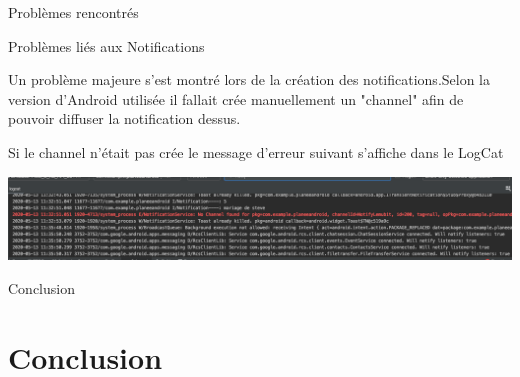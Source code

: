 \documentclass[11pt]{beamer}
\begin{document}
\begin{frame}{Problèmes rencontrés}

\begin{mybox}{Problèmes liés aux Notifications}
\begin{flushleft}
Un problème majeure s'est montré lors de la création 
des notifications.Selon la version d'Android utilisée il fallait crée manuellement un "channel" afin de pouvoir diffuser la notification dessus.
\end{flushleft}
\end{mybox}
\begin{flushleft}\pause
Si le channel n'était pas crée le message d'erreur suivant s'affiche dans le LogCat\\
\medskip
\begin{minipage}{0.48\linewidth}
\includegraphics[scale=0.35]{LogcatNotif}
\end{minipage}%
\hfill
\end{flushleft}

\end{frame}


\begin{frame}{Conclusion}
\section{Conclusion}


\end{frame}
\end{document}
